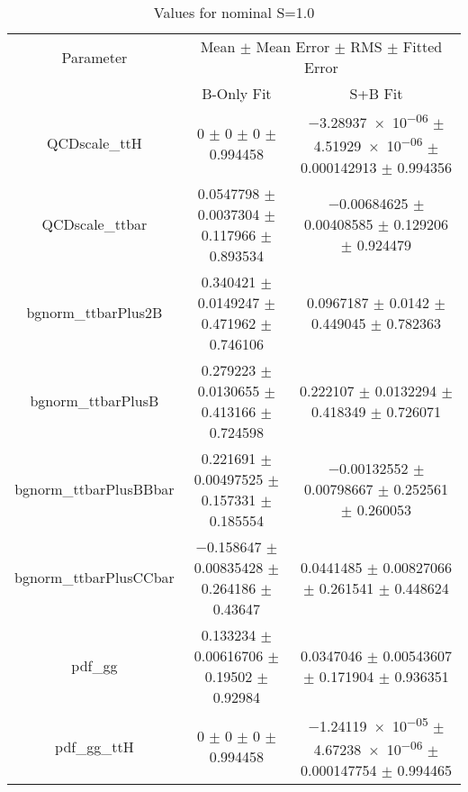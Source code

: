 \begin{table}
\centering
\caption{Values for nominal S=1.0}
\begin{tabular}{ccc}
\toprule
Parameter & \multicolumn{2}{c}{Mean $\pm$ Mean Error $\pm$ RMS $\pm$ Fitted Error}\\
 & B-Only Fit & S+B Fit\\
\midrule
QCDscale\_ttH & \num{0} $\pm$ \num{0} $\pm$ \num{0} $\pm$ \num{0.994458} & \num{-3.28937e-06} $\pm$ \num{4.51929e-06} $\pm$ \num{0.000142913} $\pm$ \num{0.994356}\\
QCDscale\_ttbar & \num{0.0547798} $\pm$ \num{0.0037304} $\pm$ \num{0.117966} $\pm$ \num{0.893534} & \num{-0.00684625} $\pm$ \num{0.00408585} $\pm$ \num{0.129206} $\pm$ \num{0.924479}\\
bgnorm\_ttbarPlus2B & \num{0.340421} $\pm$ \num{0.0149247} $\pm$ \num{0.471962} $\pm$ \num{0.746106} & \num{0.0967187} $\pm$ \num{0.0142} $\pm$ \num{0.449045} $\pm$ \num{0.782363}\\
bgnorm\_ttbarPlusB & \num{0.279223} $\pm$ \num{0.0130655} $\pm$ \num{0.413166} $\pm$ \num{0.724598} & \num{0.222107} $\pm$ \num{0.0132294} $\pm$ \num{0.418349} $\pm$ \num{0.726071}\\
bgnorm\_ttbarPlusBBbar & \num{0.221691} $\pm$ \num{0.00497525} $\pm$ \num{0.157331} $\pm$ \num{0.185554} & \num{-0.00132552} $\pm$ \num{0.00798667} $\pm$ \num{0.252561} $\pm$ \num{0.260053}\\
bgnorm\_ttbarPlusCCbar & \num{-0.158647} $\pm$ \num{0.00835428} $\pm$ \num{0.264186} $\pm$ \num{0.43647} & \num{0.0441485} $\pm$ \num{0.00827066} $\pm$ \num{0.261541} $\pm$ \num{0.448624}\\
pdf\_gg & \num{0.133234} $\pm$ \num{0.00616706} $\pm$ \num{0.19502} $\pm$ \num{0.92984} & \num{0.0347046} $\pm$ \num{0.00543607} $\pm$ \num{0.171904} $\pm$ \num{0.936351}\\
pdf\_gg\_ttH & \num{0} $\pm$ \num{0} $\pm$ \num{0} $\pm$ \num{0.994458} & \num{-1.24119e-05} $\pm$ \num{4.67238e-06} $\pm$ \num{0.000147754} $\pm$ \num{0.994465}\\
\bottomrule
\end{tabular}
\end{table}